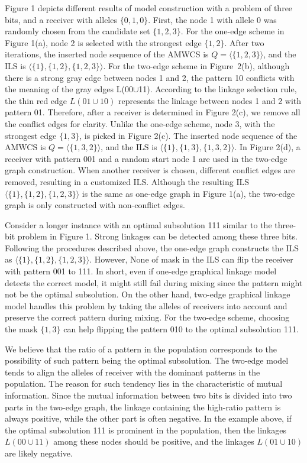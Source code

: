 Figure 1 depicts different results of model construction with  a problem of three bits, and a receiver with alleles $\{0, 1, 0\}$. First, the node 1 with allele 0 was randomly chosen from the candidate set $\{1, 2, 3\}$. For the one-edge scheme in Figure 1(a), node 2 is selected with the strongest edge $\{1, 2\}$. After two iterations, the inserted node sequence of the AMWCS  is $Q = \langle\{1, 2, 3\}\rangle$, and the ILS is  $\langle\{1\}, \{1, 2\}, \{1, 2, 3\}\rangle$. For the two-edge scheme in Figure~2(b), although there is a strong gray edge between nodes 1 and 2,  the pattern 10 conflicts with the meaning of the gray edges L(00$\cup$11). According to the linkage selection rule, the thin red edge $L(01\cup10)$ represents the linkage between nodes 1 and 2 with pattern 01. Therefore, after a receiver is determined in Figure 2(c), we remove all the conflict edges for clarity. Unlike the one-edge scheme, node 3, with the strongest edge $\{1, 3\}$, is picked in Figure 2(c). The inserted node sequence of the AMWCS is $Q = \langle\{1, 3, 2\}\rangle$,  and the ILS is $\langle\{1\}, \{1, 3\}, \{1, 3, 2\}\rangle$. In Figure 2(d), a receiver with pattern 001 and a random start node 1 are used in the two-edge graph construction. When another receiver is chosen, different conflict edges are removed, resulting in a customized ILS. Although the resulting ILS  $\langle\{1\}, \{1, 2\}, \{1, 2, 3\}\rangle$ is the same as one-edge graph in Figure 1(a), the two-edge graph is only constructed with non-conflict edges. 

Consider a longer instance with an optimal subsolution 111 similar to the three-bit problem in Figure 1. Strong linkages can be detected among these three bits. Following the procedures described above, the one-edge graph constructs the ILS as $\langle\{1\}, \{1, 2\}, \{1, 2, 3\}\rangle$. However, None of mask in the ILS can flip the receiver with pattern 001 to 111. In short, even if one-edge graphical linkage model detects the correct model, it might still fail during mixing since the pattern might not be the optimal subsolution. On the other hand, two-edge graphical linkage model  handles this problem by taking the alleles of receivers into account and preserve the correct pattern during mixing. For the two-edge scheme, choosing the mask $\{1, 3\}$ can help flipping the pattern 010 to the optimal subsolution 111.   

We believe that the ratio of a pattern in the population corresponds to the possibility of such pattern being the optimal subsolution. The two-edge model tends to align the alleles of receiver  with the dominant patterns in the population. The reason for such tendency lies in the characteristic of mutual information. Since the mutual information between two bits is divided into two parts in the two-edge graph,  the  linkage containing the high-ratio pattern  is always positive, while the other part is often negative.  In the example above, if the optimal subsolution 111 is prominent in the population, then the linkages $L(00\cup11)$ among these nodes should be positive, and the linkages $L(01\cup10)$ are likely negative.  



